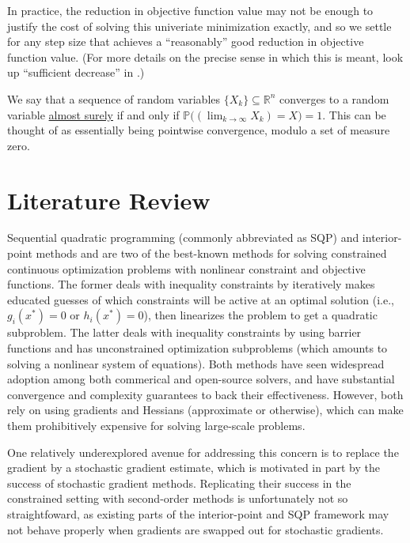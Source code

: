 \documentclass[12pt]{article}
\newcommand{\1}{\scalebox{1.06}{\ensuremath{\mathrel{\mathmybb{1}}}}}
\theoremstyle{definition}
\newcommand{\defn}[1]{\underline{#1}}
\newcommand{\R}{\mathbb{R}}
\begin{document}
In practice, the reduction in objective function value may not be enough to justify the cost of solving this univeriate minimization exactly, and so we settle for any step size that achieves a ``reasonably'' good reduction in objective function value. (For more details on the precise sense in which this is meant, look up ``sufficient decrease'' in \cite{Nocedal2006Numerical}.)

We say that a sequence of random variables $\{X_k\} \subseteq \R^n$ converges to a random variable \defn{almost surely} if and only if
$\mathbb{P}\big((\textstyle\lim_{k\to\infty} X_k) = X\big) = 1$.
This can be thought of as essentially being pointwise convergence, modulo a set of measure zero.

\section*{Literature Review}
\noindent
Sequential quadratic programming (commonly abbreviated as SQP) and interior-point methods and are two of the best-known methods for solving constrained continuous optimization problems with nonlinear constraint and objective functions. The former deals with inequality constraints by iteratively makes educated guesses of which constraints will be active at an optimal solution (i.e., $g_i(x^*) = 0$ or $h_i(x^*) = 0$), then linearizes the problem to get a quadratic subproblem. The latter deals with inequality constraints by using barrier functions and has unconstrained optimization subproblems (which amounts to solving a nonlinear system of equations).
Both methods have seen widespread adoption among both commerical and open-source solvers, and have substantial convergence and complexity guarantees to back their effectiveness. However, both rely on using gradients and Hessians (approximate or otherwise), which can make them prohibitively expensive for solving large-scale problems.

One relatively underexplored avenue for addressing this concern is to replace the gradient by a stochastic gradient estimate, which is motivated in part by the success of stochastic gradient methods. Replicating their success in the constrained setting with second-order methods is unfortunately not so straightfoward, as existing parts of the interior-point and SQP framework may not behave properly when gradients are swapped out for stochastic gradients.
\newline
\end{document}
